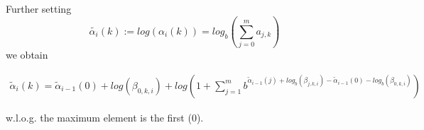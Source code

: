 \documentclass[]{article}
\newcommand{\ta}[1]{\ensuremath{\tilde{\alpha}_{#1}}}
\begin{document}
Further setting 
\[
\tilde{\alpha_i}(k) := log \left( \alpha_i(k) \right) =  
	log_b\left( \sum_{j=0}^m a_{j, k} \right)
\]
we obtain

\begin{align*}
	\ta{i}(k) = \ta{i-1}(0) + log \left(\beta_{0, k, i}\right) 
	+ log \left( 1 + \sum_{j=1}^m b^{
		\ta{i-1}(j) + log_b( \beta_{j, k, i}) - \ta{i-1}(0) - log_b(\beta_{0, k, i})		
	}
\right)
\end{align*}

w.l.o.g. the maximum element is the first (0).
\end{document}
